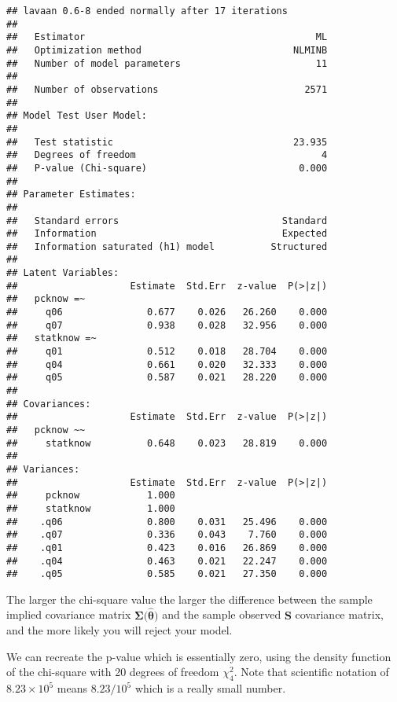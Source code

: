 \documentclass[
]{article}
\begin{document}
\begin{verbatim}
## lavaan 0.6-8 ended normally after 17 iterations
## 
##   Estimator                                         ML
##   Optimization method                           NLMINB
##   Number of model parameters                        11
##                                                       
##   Number of observations                          2571
##                                                       
## Model Test User Model:
##                                                       
##   Test statistic                                23.935
##   Degrees of freedom                                 4
##   P-value (Chi-square)                           0.000
## 
## Parameter Estimates:
## 
##   Standard errors                             Standard
##   Information                                 Expected
##   Information saturated (h1) model          Structured
## 
## Latent Variables:
##                    Estimate  Std.Err  z-value  P(>|z|)
##   pcknow =~                                           
##     q06               0.677    0.026   26.260    0.000
##     q07               0.938    0.028   32.956    0.000
##   statknow =~                                         
##     q01               0.512    0.018   28.704    0.000
##     q04               0.661    0.020   32.333    0.000
##     q05               0.587    0.021   28.220    0.000
## 
## Covariances:
##                    Estimate  Std.Err  z-value  P(>|z|)
##   pcknow ~~                                           
##     statknow          0.648    0.023   28.819    0.000
## 
## Variances:
##                    Estimate  Std.Err  z-value  P(>|z|)
##     pcknow            1.000                           
##     statknow          1.000                           
##    .q06               0.800    0.031   25.496    0.000
##    .q07               0.336    0.043    7.760    0.000
##    .q01               0.423    0.016   26.869    0.000
##    .q04               0.463    0.021   22.247    0.000
##    .q05               0.585    0.021   27.350    0.000
\end{verbatim}

The larger the chi-square value the larger the difference between the
sample implied covariance matrix \(\mathbf{\Sigma{(\hat{\theta}})}\) and
the sample observed \(\mathbf{S}\) covariance matrix, and the more
likely you will reject your model.

We can recreate the p-value which is essentially zero, using the density
function of the chi-square with 20 degrees of freedom \(\chi^{2}_{4}\).
Note that scientific notation of \(8.23 \times 10^{5}\) means
\(8.23/10^{5}\) which is a really small number.
\end{document}
